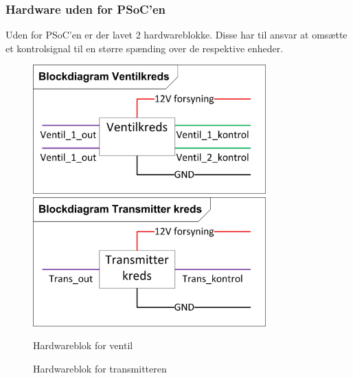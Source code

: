 \subsubsection{Hardware uden for PSoC'en}
Uden for PSoC'en er der lavet 2 hardwareblokke. Disse har til ansvar at omsætte et kontrolsignal til en større spænding over de respektive enheder.
\begin{figure}[H]
	\centering
	\begin{minipage}[b]{0.48\textwidth}\centering
	\includegraphics[width=0.80\textwidth]{billeder/Ventilblok}
	\end{minipage}
	\begin{minipage}[b]{0.48\textwidth}\centering
	\includegraphics[width=0.80\textwidth]{billeder/Transmitterblok}
	\end{minipage}
	\begin{minipage}[t]{0.48\textwidth}
	\caption{Hardwareblok for ventil}
	\label{fig:SMHW1}
	\end{minipage}
	\begin{minipage}[t]{0.48\textwidth}
	\caption{Hardwareblok for transmitteren}
	\label{fig:SMPSOC1}
	\end{minipage}
\end{figure}
